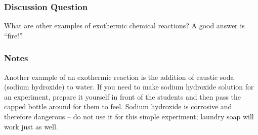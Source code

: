\subsubsection*{Discussion Question}
What are other examples of exothermic chemical reactions? A good answer is ``fire!''

\subsubsection*{Notes}
Another example of an exothermic reaction is the addition of caustic soda (sodium hydroxide) to water. If you need to make sodium hydroxide solution for an experiment, prepare it yourself in front of the students and then pass the capped bottle around for them to feel. Sodium hydroxide is corrosive and therefore dangerous -- do not use it for this simple experiment; laundry soap will work just as well.